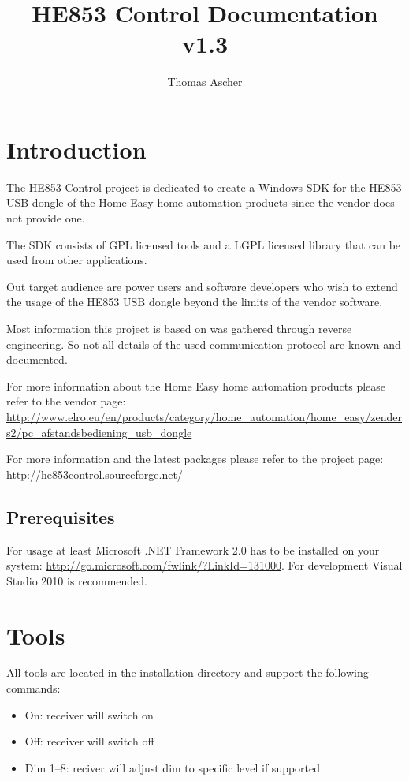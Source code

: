 \documentclass[
a4paper,
oneside,
halfparskip*,
normalheadings,
]
{scrbook}
\begin{document}
\title{HE853 Control Documentation v1.3}
\author{Thomas Ascher}
\maketitle
\tableofcontents
\mainmatter

\chapter{Introduction}

The HE853 Control project is dedicated to create a Windows SDK for the HE853 USB
dongle of the Home Easy home automation products since the vendor does not provide
one.

The SDK consists of GPL licensed tools and a LGPL licensed library that can be
used from other applications.

Out target audience are power users and software developers who wish to extend the
usage of the HE853 USB dongle beyond the limits of the vendor software.

Most information this project is based on was gathered through reverse engineering.
So not all details of the used communication protocol are known and documented.

For more information about the Home Easy home automation products please refer to
the vendor page: \url{http://www.elro.eu/en/products/category/home_automation/home_easy/zenders2/pc_afstandsbediening_usb_dongle}

For more information and the latest packages please refer to the project page:
\url{http://he853control.sourceforge.net/}

\section{Prerequisites}
For usage at least Microsoft .NET Framework 2.0 has to be installed on your
system: \url{http://go.microsoft.com/fwlink/?LinkId=131000}. For development
Visual Studio 2010 is recommended.




\chapter{Tools}

All tools are located in the installation directory and support the following commands:

\begin{itemize}
	\item On: receiver will switch on
	\item Off: receiver will switch off
	\item Dim 1--8: reciver will adjust dim to specific level if supported
\end{itemize}
\end{document}
